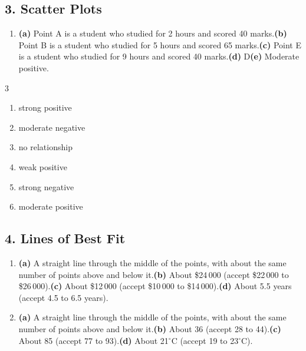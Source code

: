\documentclass[12pt,a4paper]{article}
\begin{document}
\subsection*{3. Scatter Plots}
\begin{enumerate}[nosep, label=\arabic*., start=1]
\item \textbf{(a)} Point A is a student who studied for 2 hours and scored 40 marks.\quad \textbf{(b)} Point B is a student who studied for 5 hours and scored 65 marks.\quad \textbf{(c)} Point E is a student who studied for 9 hours and scored 40 marks.\quad \textbf{(d)} D\quad \textbf{(e)} Moderate positive.
\end{enumerate}
\begin{multicols}{3}\begin{enumerate}[nosep, label=\arabic*., start=2]
\item strong positive
\item moderate negative
\item no relationship
\item weak positive
\item strong negative
\item moderate positive
\end{enumerate}\end{multicols}

\subsection*{4. Lines of Best Fit}
\begin{enumerate}[nosep, label=\arabic*., start=1]
\item \textbf{(a)} A straight line through the middle of the points, with about the same number of points above and below it.\quad \textbf{(b)} About \$24\,000 (accept \$22\,000 to \$26\,000).\quad \textbf{(c)} About \$12\,000 (accept \$10\,000 to \$14\,000).\quad \textbf{(d)} About 5.5 years (accept 4.5 to 6.5 years).
\item \textbf{(a)} A straight line through the middle of the points, with about the same number of points above and below it.\quad \textbf{(b)} About 36 (accept 28 to 44).\quad \textbf{(c)} About 85 (accept 77 to 93).\quad \textbf{(d)} About 21$^\circ$C (accept 19 to 23$^\circ$C).
\end{enumerate}
\end{document}
